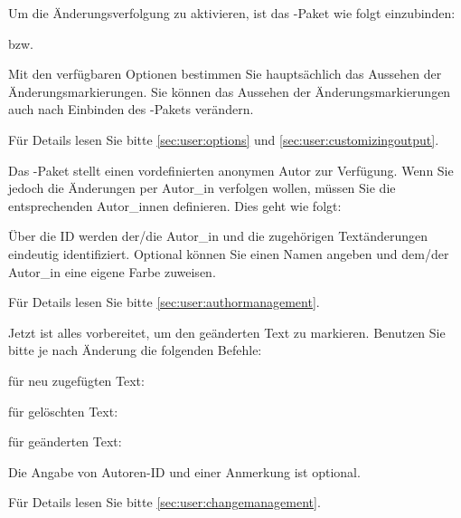 
Um die Änderungsverfolgung zu aktivieren, ist das -Paket wie folgt einzubinden:


bzw.


Mit den verfügbaren Optionen bestimmen Sie hauptsächlich das Aussehen der Änderungsmarkierungen.
Sie können das Aussehen der Änderungsmarkierungen auch nach Einbinden des -Pakets verändern.

Für Details lesen Sie bitte \autoref{sec:user:options} und \autoref{sec:user:customizingoutput}.


Das -Paket stellt einen vordefinierten anonymen Autor zur Verfügung.
Wenn Sie jedoch die Änderungen per Autor\_in verfolgen wollen, müssen Sie die entsprechenden Autor\_innen definieren.
Dies geht wie folgt:


Über die ID werden der/die Autor\_in und die zugehörigen Textänderungen eindeutig identifiziert.
Optional können Sie einen Namen angeben und dem/der Autor\_in eine eigene Farbe zuweisen.

Für Details lesen Sie bitte \autoref{sec:user:authormanagement}.


Jetzt ist alles vorbereitet, um den geänderten Text zu markieren.
Benutzen Sie bitte je nach Änderung die folgenden Befehle:

für neu zugefügten Text:\\

für gelöschten Text:\\

für geänderten Text:\\

Die Angabe von Autoren-ID und einer Anmerkung ist optional.

Für Details lesen Sie bitte \autoref{sec:user:changemanagement}.


